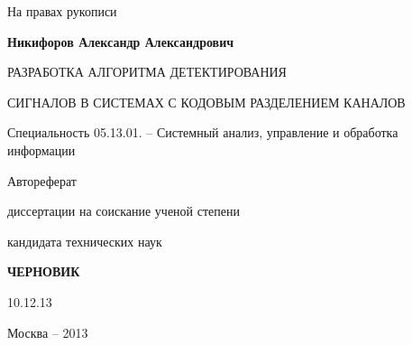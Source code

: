 \hfill На правах рукописи

\vspace{\baselineskip}
\vspace{\baselineskip}
\vspace{\baselineskip}
\vspace{\baselineskip}

\noindent\centerline{\bf{Никифоров Александр Александрович}}

\vspace{\baselineskip}
\vspace{\baselineskip}
\vspace{\baselineskip}
\vspace{\baselineskip}

\noindent\centerline{РАЗРАБОТКА АЛГОРИТМА ДЕТЕКТИРОВАНИЯ}
\noindent\centerline{СИГНАЛОВ В СИСТЕМАХ С КОДОВЫМ РАЗДЕЛЕНИЕМ КАНАЛОВ}

\vspace{\baselineskip}
\vspace{\baselineskip}
\vspace{\baselineskip}
\vspace{\baselineskip}

\noindent\centerline{Специальность 05.13.01. – Системный анализ, управление и обработка информации}

\vspace{\baselineskip}
\vspace{\baselineskip}
\vspace{\baselineskip}
\vspace{\baselineskip}

\noindent\centerline{Автореферат} 
\noindent\centerline{диссертации на соискание ученой степени}
\noindent\centerline{кандидата технических наук}


\vspace{\baselineskip}
\vspace{\baselineskip}
\vspace{\baselineskip}
\vspace{\baselineskip}
\noindent\centerline{\bf{ЧЕРНОВИК}}
\noindent\centerline{10.12.13}

\vfill
\noindent\centerline{Москва – 2013}

\newpage

\vspace{\baselineskip}
\vspace{\baselineskip}
\vspace{\baselineskip}
\vspace{\baselineskip}

